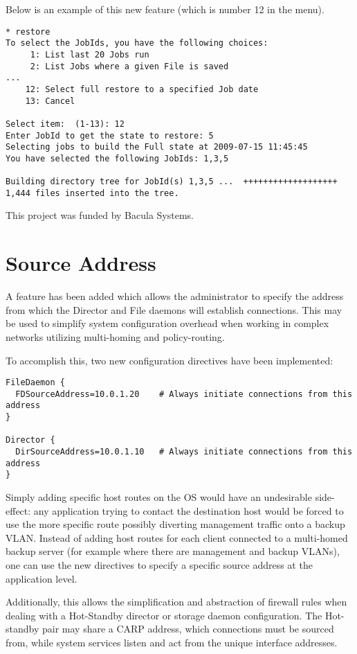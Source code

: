Below is an example of this new feature (which is number 12 in the
menu).

\begin{verbatim}
* restore
To select the JobIds, you have the following choices:
     1: List last 20 Jobs run
     2: List Jobs where a given File is saved
...
    12: Select full restore to a specified Job date
    13: Cancel

Select item:  (1-13): 12
Enter JobId to get the state to restore: 5
Selecting jobs to build the Full state at 2009-07-15 11:45:45
You have selected the following JobIds: 1,3,5

Building directory tree for JobId(s) 1,3,5 ...  +++++++++++++++++++
1,444 files inserted into the tree.
\end{verbatim}

This project was funded by Bacula Systems.

\section{Source Address}

A feature has been added which allows the administrator to specify the address
from which the Director and File daemons will establish connections.  This
may be used to simplify system configuration overhead when working in complex
networks utilizing multi-homing and policy-routing.

To accomplish this, two new configuration directives have been implemented:
\begin{verbatim}
FileDaemon {
  FDSourceAddress=10.0.1.20    # Always initiate connections from this address
}

Director {
  DirSourceAddress=10.0.1.10   # Always initiate connections from this address
}
\end{verbatim}

Simply adding specific host routes on the OS
would have an undesirable side-effect: any
application trying to contact the destination host would be forced to use the
more specific route possibly diverting management traffic onto a backup VLAN.
Instead of adding host routes for each client connected to a multi-homed backup
server (for example where there are management and backup VLANs), one can
use the new directives to specify a specific source address at the application
level.

Additionally, this allows the simplification and abstraction of firewall rules
when dealing with a Hot-Standby director or storage daemon configuration.  The
Hot-standby pair may share a CARP address, which connections must be sourced
from, while system services listen and act from the unique interface addresses.

